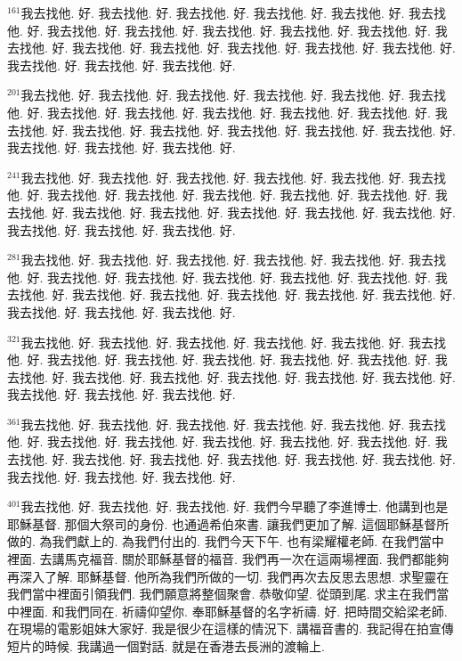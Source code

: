 \documentclass{book}
\begin{document}
$^{161}$我去找他.
好.
我去找他.
好.
我去找他.
好.
我去找他.
好.
我去找他.
好.
我去找他.
好.
我去找他.
好.
我去找他.
好.
我去找他.
好.
我去找他.
好.
我去找他.
好.
我去找他.
好.
我去找他.
好.
我去找他.
好.
我去找他.
好.
我去找他.
好.
我去找他.
好.
我去找他.
好.
我去找他.
好.
我去找他.
好.

$^{201}$我去找他.
好.
我去找他.
好.
我去找他.
好.
我去找他.
好.
我去找他.
好.
我去找他.
好.
我去找他.
好.
我去找他.
好.
我去找他.
好.
我去找他.
好.
我去找他.
好.
我去找他.
好.
我去找他.
好.
我去找他.
好.
我去找他.
好.
我去找他.
好.
我去找他.
好.
我去找他.
好.
我去找他.
好.
我去找他.
好.

$^{241}$我去找他.
好.
我去找他.
好.
我去找他.
好.
我去找他.
好.
我去找他.
好.
我去找他.
好.
我去找他.
好.
我去找他.
好.
我去找他.
好.
我去找他.
好.
我去找他.
好.
我去找他.
好.
我去找他.
好.
我去找他.
好.
我去找他.
好.
我去找他.
好.
我去找他.
好.
我去找他.
好.
我去找他.
好.
我去找他.
好.

$^{281}$我去找他.
好.
我去找他.
好.
我去找他.
好.
我去找他.
好.
我去找他.
好.
我去找他.
好.
我去找他.
好.
我去找他.
好.
我去找他.
好.
我去找他.
好.
我去找他.
好.
我去找他.
好.
我去找他.
好.
我去找他.
好.
我去找他.
好.
我去找他.
好.
我去找他.
好.
我去找他.
好.
我去找他.
好.
我去找他.
好.

$^{321}$我去找他.
好.
我去找他.
好.
我去找他.
好.
我去找他.
好.
我去找他.
好.
我去找他.
好.
我去找他.
好.
我去找他.
好.
我去找他.
好.
我去找他.
好.
我去找他.
好.
我去找他.
好.
我去找他.
好.
我去找他.
好.
我去找他.
好.
我去找他.
好.
我去找他.
好.
我去找他.
好.
我去找他.
好.
我去找他.
好.

$^{361}$我去找他.
好.
我去找他.
好.
我去找他.
好.
我去找他.
好.
我去找他.
好.
我去找他.
好.
我去找他.
好.
我去找他.
好.
我去找他.
好.
我去找他.
好.
我去找他.
好.
我去找他.
好.
我去找他.
好.
我去找他.
好.
我去找他.
好.
我去找他.
好.
我去找他.
好.
我去找他.
好.
我去找他.
好.
我去找他.
好.

$^{401}$我去找他.
好.
我去找他.
好.
我去找他.
好.
我們今早聽了李進博士.
他講到也是耶穌基督.
那個大祭司的身份.
也通過希伯來書.
讓我們更加了解.
這個耶穌基督所做的.
為我們獻上的.
為我們付出的.
我們今天下午.
也有梁耀權老師.
在我們當中裡面.
去講馬克福音.
關於耶穌基督的福音.
我們再一次在這兩場裡面.
我們都能夠再深入了解.
耶穌基督.
他所為我們所做的一切.
我們再次去反思去思想.
求聖靈在我們當中裡面引領我們.
我們願意將整個聚會.
恭敬仰望.
從頭到尾.
求主在我們當中裡面.
和我們同在.
祈禱仰望你.
奉耶穌基督的名字祈禱.
好.
把時間交給梁老師.
在現場的電影姐妹大家好.
我是很少在這樣的情況下.
講福音書的.
我記得在拍宣傳短片的時候.
我講過一個對話.
就是在香港去長洲的渡輪上.
\end{document}

